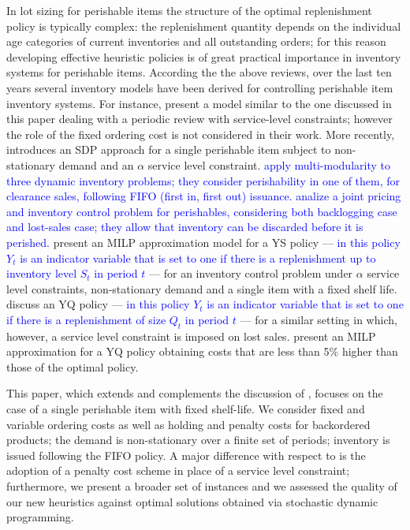 \documentclass{tPRS2e}
\newcommand{\blue}{\textcolor{blue}}
\begin{document}
In lot sizing for perishable items the structure of the optimal replenishment policy is typically complex: the replenishment quantity depends on the individual age categories of current inventories and all outstanding orders; for this reason developing effective heuristic policies is of great practical importance in inventory systems for perishable items. According the the above reviews, over the last ten years several inventory models have been derived for controlling perishable item inventory systems. For instance, \cite{citeulike:6806835} present a model similar to  the one discussed in this paper dealing with a periodic review with service-level constraints; however the role of the fixed ordering cost is not considered in their work. More recently, \cite{citeulike:12534249} introduces an SDP approach for a single perishable item subject to non-stationary demand and an $\alpha$ service level constraint. 
\blue{\cite{doi:10.1287/msom.2014.0488} apply multi-modularity to three dynamic inventory problems; they consider perishability in one of them, for clearance sales, following FIFO (first in, first out) issuance. \cite{doi:10.1287/opre.2014.1261} analize a joint pricing and inventory control problem for perishables, considering both backlogging case and lost-sales case; they allow that inventory can be discarded before it is perished.}	
	\cite{citeulike:13666707} present an MILP approximation model for a YS policy --- \blue{in this policy $Y_t$ is an indicator variable that is set to one if there is a replenishment up to inventory level $S_t$ in period $t$} --- for an inventory control problem under $\alpha$ service level constraints, non-stationary demand and a single item with a fixed shelf life. \cite{GAlcoba:ICCSA2015} discuss an YQ policy --- \blue{in this policy $Y_t$ is an indicator variable that is set to one if there is a replenishment of size $Q_t$ in period $t$} --- for a similar setting in which, however, a service level constraint is imposed on lost sales. \cite{PaulsWorm2015} present an MILP approximation for a YQ policy obtaining costs that are less than 5\% higher than those of the optimal policy.
	
	This paper, which extends and complements the discussion of \cite{citeulike:12592650}, focuses on the case of a single perishable item with fixed shelf-life. We consider fixed and variable ordering costs as well as holding and penalty costs for backordered products; the demand is non-stationary over a finite set of periods; inventory is issued following the FIFO policy. A major difference with respect to \cite{citeulike:12592650} is the adoption of a penalty cost scheme in place of a service level constraint; furthermore, we present a broader set of instances and we assessed the quality of our new heuristics against optimal solutions obtained via stochastic dynamic programming.
	
\end{document}
